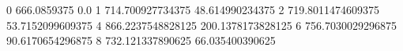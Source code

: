 0 666.0859375 0.0
1 714.700927734375 48.614990234375
2 719.8011474609375 53.7152099609375
4 866.2237548828125 200.1378173828125
6 756.7030029296875 90.6170654296875
8 732.121337890625 66.035400390625
